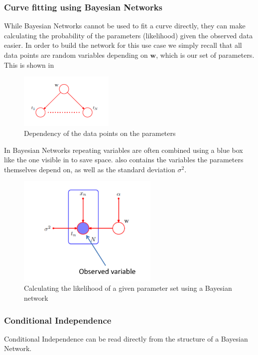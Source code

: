 \documentclass{article}
\begin{document}
\subsubsection{Curve fitting using Bayesian Networks}
While Bayesian Networks cannot be used to fit a curve directly, they can make calculating the probability of the parameters (likelihood) given the observed data easier.
In order to build the network for this use case we simply recall that all data points are random variables depending on $\mathbf{w}$, which is our set of parameters.
This is shown in 

\begin{figure}[h]
	\center
	\includegraphics[width=0.4\textwidth]{dependency.png}
	\caption{Dependency of the data points on the parameters}
	\label{im:dependency}
\end{figure}

In Bayesian Networks repeating variables are often combined using a blue box like the one visible in  to save space.
 also contains the variables the parameters themselves depend on, as well as the standard deviation $\sigma^2$.

\begin{figure}[h]
	\center
	\includegraphics[width=0.6\textwidth]{bnet-parameters.png}
	\caption{Calculating the likelihood of a given parameter set using a Bayesian network}
	\label{im:parameters}
\end{figure}

\subsubsection{Conditional Independence}
Conditional Independence can be read directly from the structure of a Bayesian Network.
\end{document}
